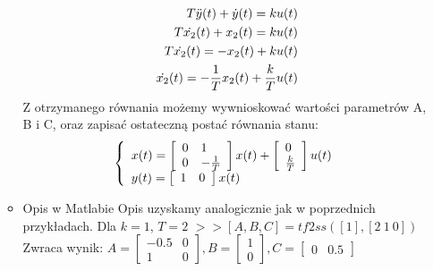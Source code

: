 \documentclass[a4paper,10pt]{article}
\begin{document}
\begin{itemize}
\begin{itemize}
	\begin{eqnarray}
		\nonumber T\ddot{y}(t) + \dot{y}(t) = ku(t)\\
		\nonumber T\dot{x_{2}}(t) + x_{2}(t) = ku(t)\\
		\nonumber T\dot{x_{2}}(t) = - x_{2}(t) + ku(t)\\
		\dot{x_{2}}(t) = -{1 \over T}x_{2}(t) + {k \over T}u(t)
	\end{eqnarray}
Z otrzymanego równania możemy wywnioskować wartości parametrów A, B i C, oraz zapisać ostateczną postać równania stanu:
	\begin{eqnarray}
		\left\{
			\begin{array}{l}
				x(t) = \left[ 
			\begin{array}{ll}
				0 & 1\\
				0 & -{1 \over T}
			\end{array}
		\right] x(t) + \left[ 
			\begin{array}{l}
				0\\
				{k \over T}
			\end{array}
		\right] u(t)\\
				y(t) = \left[ 
			\begin{array}{ll}
				1 & 0
			\end{array}
		\right]x(t)
			\end{array} \right.
	\end{eqnarray}
\item Opis w Matlabie
\newline Opis uzyskamy analogicznie jak w poprzednich przykładach.
\newline\newline Dla $k=1$, $T=2$
\newline $>>[A,B,C] = tf2ss([1], [2 \ 1 \ 0])$
\newline Zwraca wynik:
$A = \left[ \begin{array}{ll} -0.5 & 0\\ 1 & 0 \end{array} \right], B = \left[ \begin{array}{l} 1\\ 0 \end{array} \right], C = \left[ \begin{array}{ll} 0 & 0.5 \end{array} \right]$

\end{itemize}


\end{itemize}
\end{document}
